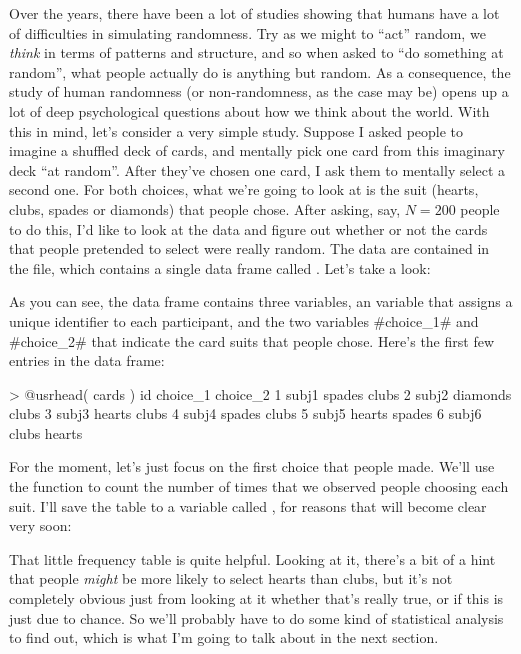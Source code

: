 Over the years, there have been a lot of studies showing that humans have a lot of difficulties in simulating randomness. Try as we might to ``act'' random, we {\it think} in terms of patterns and structure, and so when asked to ``do something at random'', what people actually do is anything but random. As a consequence, the study of human randomness (or non-randomness, as the case may be) opens up a lot of deep psychological questions about how we think about the world. With this in mind, let's consider a very simple study. Suppose I asked people to imagine a shuffled deck of cards, and mentally pick one card from this imaginary deck ``at random''. After they've chosen one card, I ask them to mentally select a second one. For both choices, what we're going to look at is the suit (hearts, clubs, spades or diamonds) that people chose. After asking, say, $N=200$ people to do this, I'd like to look at the data and figure out whether or not the cards that people pretended to select were really random. The data are contained in the  file, which contains a single data frame called . Let's take a look:
As you can see, the  data frame contains three variables, an  variable that assigns a unique identifier to each participant, and the two variables \rtextverb#choice_1# and \rtextverb#choice_2# that indicate the card suits that people chose. Here's the first few entries in the data frame:
\begin{rblock1}       
> @usr{head( cards )}
     id choice_1 choice_2
1 subj1   spades    clubs
2 subj2 diamonds    clubs
3 subj3   hearts    clubs
4 subj4   spades    clubs
5 subj5   hearts   spades
6 subj6    clubs   hearts
\end{rblock1}
For the moment, let's just focus on the first choice that people made. We'll use the  function to count the number of times that we observed people choosing each suit. I'll save the table to a variable called , for reasons that will become clear very soon:


That little frequency table is quite helpful. Looking at it, there's a bit of a hint that people {\it might} be more likely to select hearts than clubs, but it's not completely obvious just from looking at it whether that's really true, or if this is just due to chance. So we'll probably have to do some kind of statistical analysis to find out, which is what I'm going to talk about in the next section. 
 

